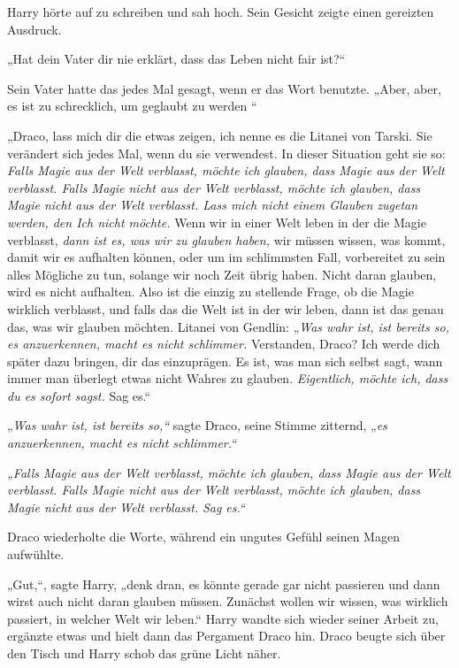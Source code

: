 {Harry hörte auf zu schreiben und sah hoch. Sein Gesicht zeigte einen gereizten Ausdruck.

„Hat dein Vater dir nie erklärt, dass das Leben nicht fair ist?“

Sein Vater hatte das jedes Mal gesagt, wenn er das Wort benutzte. „Aber, aber, es ist zu schrecklich, um geglaubt zu werden \later“

„Draco, lass mich dir die etwas zeigen, ich nenne es die Litanei von Tarski. Sie verändert sich jedes Mal, wenn du sie verwendest. In dieser Situation geht sie so: \emph{Falls Magie aus der Welt verblasst, möchte ich glauben, dass Magie aus der Welt verblasst. Falls Magie nicht aus der Welt verblasst, möchte ich glauben, dass Magie nicht aus der Welt verblasst. Lass mich nicht einem Glauben zugetan werden, den Ich nicht möchte.} Wenn wir in einer Welt leben in der die Magie verblasst, \emph{dann ist es, was wir zu glauben haben,} wir müssen wissen, was kommt, damit wir es aufhalten können, oder um im schlimmsten Fall, vorbereitet zu sein alles Mögliche zu tun, solange wir noch Zeit übrig haben. Nicht daran glauben, wird es nicht aufhalten. Also ist die einzig zu stellende Frage, ob die Magie wirklich verblasst, und falls das die Welt ist in der wir leben, dann ist das genau das, was wir glauben möchten. Litanei von Gendlin: „\emph{Was wahr ist, ist bereits so, es anzuerkennen, macht es nicht schlimmer.} Verstanden, Draco? Ich werde dich später dazu bringen, dir das einzuprägen. Es ist, was man sich selbst sagt, wann immer man überlegt etwas nicht Wahres zu glauben. \emph{Eigentlich, möchte ich, dass du es sofort sagst.} Sag es.“

„\emph{Was wahr ist, ist bereits so,“} sagte Draco, seine Stimme zitternd, „\emph{es anzuerkennen, macht es nicht schlimmer.“}

\emph{„Falls Magie aus der Welt verblasst, möchte ich glauben, dass Magie aus der Welt verblasst. Falls Magie nicht aus der Welt verblasst, möchte ich glauben, dass Magie nicht aus der Welt verblasst.} \emph{Sag es.“}

Draco wiederholte die Worte, während ein ungutes Gefühl seinen Magen aufwühlte.

„Gut,“, sagte Harry, „denk dran, es könnte gerade gar nicht passieren und dann wirst auch nicht daran glauben müssen. Zunächst wollen wir wissen, was wirklich passiert, in welcher Welt wir leben.“ Harry wandte sich wieder seiner Arbeit zu, ergänzte etwas und hielt dann das Pergament Draco hin. Draco beugte sich über den Tisch und Harry schob das grüne Licht näher.

}
